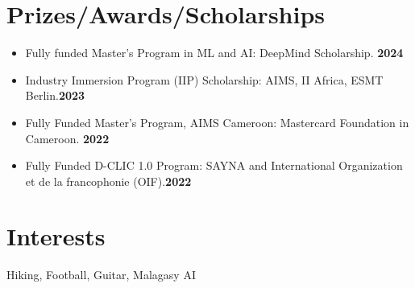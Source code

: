 \documentclass[a4paper,8pt]{article}
\newlength{\lfonts}
\begin{document}
\section{Prizes/Awards/Scholarships}
\begin{itemize}
	\item[\faTrophy] Fully funded Master's Program in ML and AI: DeepMind Scholarship. \hfill \textbf{\color{emphasis}2024}
	\item[\faTrophy] Industry Immersion Program (IIP) Scholarship: AIMS, II Africa, ESMT Berlin.\hfill \textbf{\color{emphasis}2023}
	\item[\faTrophy] Fully Funded Master's Program, AIMS Cameroon: Mastercard Foundation in Cameroon. \hfill \textbf{\color{emphasis}2022}
	\item[\faTrophy] Fully Funded D-CLIC 1.0 Program: SAYNA and International Organization et de la francophonie (OIF).\hfill \textbf{\color{emphasis}2022}
\end{itemize}
\section{Interests}
\makebox[2.5\lfonts][r]{\faFootballBall ~~}\parbox{\linewidth}{ Hiking, Football, Guitar, Malagasy AI}
\end{document}
